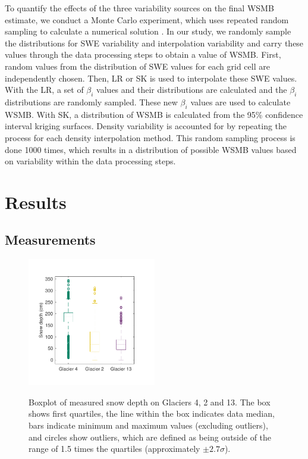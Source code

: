 \documentclass[twocolumn,letterpaper]{igs}
\begin{document}
To quantify the effects of the three variability sources on the final WSMB estimate, we conduct a Monte Carlo experiment, which uses repeated random sampling to calculate a numerical solution \citep{Metropolis1949}. In our study, we randomly sample the distributions for SWE variability and interpolation variability and carry these values through the data processing steps to obtain a value of WSMB. First, random values from the distribution of SWE values for each grid cell are independently chosen. Then, LR or SK is used to interpolate these SWE values. With the LR, a set of $\beta_i$ values and their distributions are calculated and the $\beta_i$ distributions are randomly sampled. These new $\beta_i$ values are used to calculate WSMB. With SK, a distribution of WSMB is calculated from the 95\% confidence interval kriging surfaces. Density variability is accounted for by repeating the process for each density interpolation method. This random sampling process is done 1000 times, which results in a distribution of possible WSMB values based on variability within the data processing steps.

\section{Results}

\subsection{Measurements}

\begin{figure}
	\centering
	\includegraphics[width =0.5\textwidth]{DepthBoxplot.pdf}\\
	\caption{Boxplot of measured snow depth on Glaciers 4, 2 and 13. The box shows first quartiles, the line within the box indicates data median, bars indicate minimum and maximum values (excluding outliers), and circles show outliers, which are defined as being outside of the range of 1.5 times the quartiles (approximately $\pm2.7\sigma$). }
	\label{fig:DepthBoxplot}
\end{figure}
\end{document}
